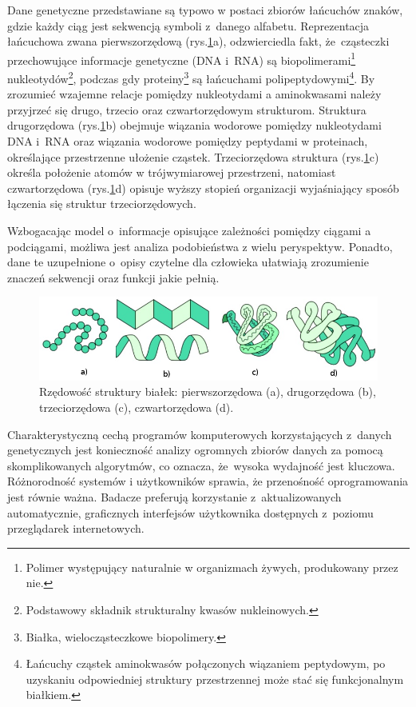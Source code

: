 \documentclass[a4paper,12pt,oneside]{mwrep}  %
\begin{document}
Dane genetyczne przedstawiane są typowo w postaci zbiorów łańcuchów znaków, gdzie każdy ciąg jest sekwencją symboli z~danego alfabetu. Reprezentacja łańcuchowa zwana pierwszorzędową (rys.\ref{rzedowe-struktury-bialek}a), odzwierciedla fakt, że~cząsteczki przechowujące informacje genetyczne (DNA i~RNA) są biopolimerami\footnote{Polimer występujący naturalnie w organizmach żywych, produkowany przez nie.} nukleotydów\footnote{Podstawowy składnik strukturalny kwasów nukleinowych.}, podczas gdy proteiny\footnote{Białka, wielocząsteczkowe biopolimery.} są łańcuchami polipeptydowymi\footnote{Łańcuchy cząstek aminokwasów połączonych wiązaniem peptydowym, po uzyskaniu odpowiedniej struktury przestrzennej może stać się funkcjonalnym białkiem.}. By zrozumieć wzajemne relacje pomiędzy nukleotydami a aminokwasami należy przyjrzeć się drugo, trzecio oraz czwartorzędowym strukturom. Struktura drugorzędowa (rys.\ref{rzedowe-struktury-bialek}b) obejmuje wiązania wodorowe pomiędzy nukleotydami DNA i~RNA oraz wiązania wodorowe pomiędzy peptydami w proteinach, określające przestrzenne ułożenie cząstek. Trzeciorzędowa struktura (rys.\ref{rzedowe-struktury-bialek}c) określa położenie atomów w trójwymiarowej przestrzeni, natomiast czwartorzędowa (rys.\ref{rzedowe-struktury-bialek}d) opisuje wyższy stopień organizacji wyjaśniający sposób łączenia się struktur trzeciorzędowych.
\cite{bioweb, pl-wiki-biopolimer, pl-wiki-nukl, pl-wiki-bialka, pl-wiki-2nd-struct, e-biotech-bialka}

Wzbogacając model o~informacje opisujące zależności pomiędzy ciągami a podciągami, możliwa jest analiza podobieństwa z wielu peryspektyw. Ponadto, dane te uzupełnione o~opisy czytelne dla człowieka ułatwiają zrozumienie znaczeń sekwencji oraz funkcji jakie pełnią.
\cite{bioweb}
\begin{figure}[!h]
\centering
\includegraphics[width=1\textwidth]{grafika/struktury_bialek.png}
\caption{Rzędowość struktury białek: pierwszorzędowa (a), drugorzędowa (b), trzeciorzędowa (c), czwartorzędowa (d).}
\label{rzedowe-struktury-bialek}
\end{figure}

Charakterystyczną cechą programów komputerowych korzystających z~danych genetycznych jest konieczność analizy ogromnych zbiorów danych za pomocą skomplikowanych algorytmów, co oznacza, że~wysoka wydajność jest kluczowa. Różnorodność systemów i użytkowników sprawia, że przenośność oprogramowania jest równie ważna. Badacze preferują korzystanie z~aktualizowanych automatycznie, graficznych interfejsów użytkownika dostępnych z~poziomu przeglądarek internetowych.
\cite{bioweb}
\end{document}
